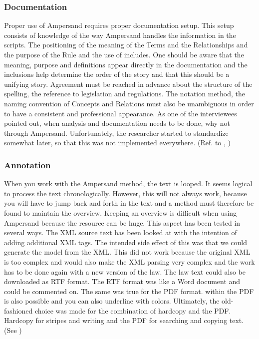 \subsubsection{Documentation}\label{subsub:1_documentation}
Proper use of Ampersand requires proper documentation setup.
This setup consists of knowledge of the way Ampersand handles the information in the scripts.
The positioning of the meaning of the Terms and the Relationships and the purpose of the Rule and the use of includes.
One should be aware that the meaning, purpose and definitions appear directly in the documentation and the inclusions help determine the order of the story and that this should be a unifying story.
Agreement must be reached in advance about the structure of the spelling, the reference to legislation and regulations.
The notation method, the naming convention of Concepts and Relations must also be unambiguous in order to have a consistent and professional appearance.
As one of the interviewees pointed out, when analysis and documentation needs to be done, why not through Ampersand.
Unfortunately, the researcher started to standardize somewhat later, so that this was not implemented everywhere.
(Ref. to , )


\subsubsection{Annotation}\label{subsub:1_annotation}
When you work with the Ampersand method, the text is looped. It seems logical to process the text chronologically.
However, this will not always work, because you will have to jump back and forth in the text and a method must therefore be found to maintain the overview.
Keeping an overview is difficult when using Ampersand because the resource can be huge.
This aspect has been tested in several ways.
The XML source text has been looked at with the intention of adding additional XML tags.
The intended side effect of this was that we could generate the model from the XML.
This did not work because the original XML is too complex and would also make the XML parsing very complex and the work has to be done again with a new version of the law.
The law text could also be downloaded as RTF format. The RTF format was like a Word document and could be commented on.
The same was true for the PDF format.
 within the PDF is also possible and you can also underline with colors.
Ultimately, the old-fashioned choice was made for the combination of hardcopy and the PDF.
Hardcopy for stripes and writing and the PDF for searching and copying text.
(See )


